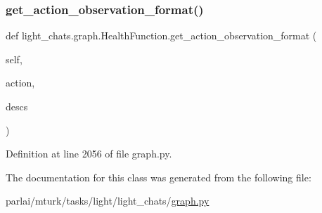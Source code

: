 \subsubsection{\texorpdfstring{get\+\_\+action\+\_\+observation\+\_\+format()}{get\_action\_observation\_format()}}
{\footnotesize\ttfamily def light\+\_\+chats.\+graph.\+Health\+Function.\+get\+\_\+action\+\_\+observation\+\_\+format (\begin{DoxyParamCaption}\item[{}]{self,  }\item[{}]{action,  }\item[{}]{descs }\end{DoxyParamCaption})}



Definition at line 2056 of file graph.\+py.



The documentation for this class was generated from the following file\+:\begin{DoxyCompactItemize}
\item 
parlai/mturk/tasks/light/light\+\_\+chats/\hyperlink{parlai_2mturk_2tasks_2light_2light__chats_2graph_8py}{graph.\+py}\end{DoxyCompactItemize}
